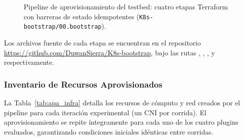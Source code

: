 \begin{figure}[htbp]
\shorthandon{>}
\caption{Pipeline de aprovisionamiento del testbed: cuatro etapas
         Terraform con barreras de estado idempotentes
         (\texttt{K8s-bootstrap/00.bootstrap}).}
\label{fig:apa_pipeline}
\end{figure}

Los archivos fuente de cada etapa se encuentran en el repositorio
\url{https://github.com/DuwanSierra/K8s-bootstrap}, bajo las rutas
, ,
, 
y  respectivamente.

\subsubsection{Inventario de Recursos Aprovisionados}

La Tabla~\ref{tab:apa_infra} detalla los recursos de cómputo y red
creados por el pipeline para cada iteración experimental (un CNI por
corrida). El aprovisionamiento se repite íntegramente para cada uno
de los cuatro plugins evaluados, garantizando condiciones iniciales
idénticas entre corridas.

